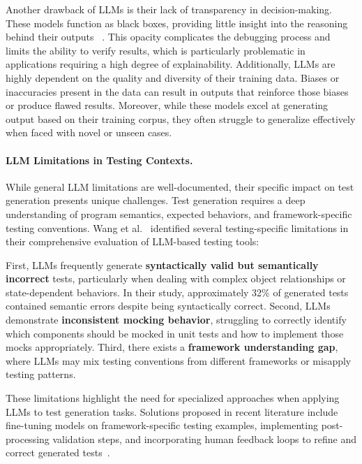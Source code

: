 \hspace{0.5cm} Another drawback of LLMs is their lack of transparency in decision-making. These models function as black boxes, providing little insight into the reasoning behind their outputs ~\cite{LLMLimitations}. This opacity complicates the debugging process and limits the ability to verify results, which is particularly problematic in applications requiring a high degree of explainability. Additionally, LLMs are highly dependent on the quality and diversity of their training data. Biases or inaccuracies present in the data can result in outputs that reinforce those biases or produce flawed results. Moreover, while these models excel at generating output based on their training corpus, they often struggle to generalize effectively when faced with novel or unseen cases.

\paragraph{LLM Limitations in Testing Contexts.} While general LLM limitations are well-documented, their specific impact on test generation presents unique challenges. Test generation requires a deep understanding of program semantics, expected behaviors, and framework-specific testing conventions. Wang et al.~\cite{LLMTestingLimitations} identified several testing-specific limitations in their comprehensive evaluation of LLM-based testing tools:

\hspace{0.5cm} First, LLMs frequently generate \textbf{syntactically valid but semantically incorrect} tests, particularly when dealing with complex object relationships or state-dependent behaviors. In their study, approximately 32\% of generated tests contained semantic errors despite being syntactically correct. Second, LLMs demonstrate \textbf{inconsistent mocking behavior}, struggling to correctly identify which components should be mocked in unit tests and how to implement those mocks appropriately. Third, there exists a \textbf{framework understanding gap}, where LLMs may mix testing conventions from different frameworks or misapply testing patterns.

\hspace{0.5cm} These limitations highlight the need for specialized approaches when applying LLMs to test generation tasks. Solutions proposed in recent literature include fine-tuning models on framework-specific testing examples, implementing post-processing validation steps, and incorporating human feedback loops to refine and correct generated tests~\cite{LLMTestEnhancements}.

